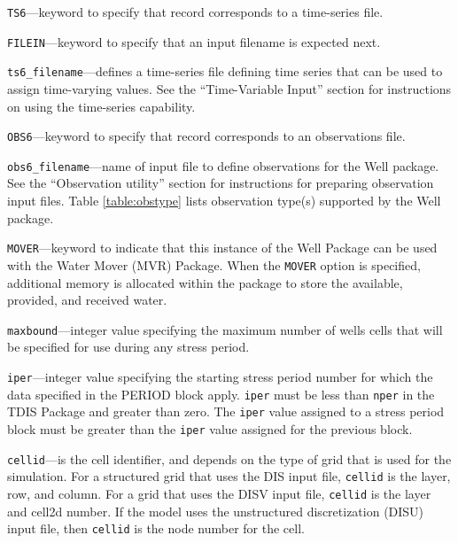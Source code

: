 \item \texttt{TS6}---keyword to specify that record corresponds to a time-series file.

\item \texttt{FILEIN}---keyword to specify that an input filename is expected next.

\item \texttt{ts6\_filename}---defines a time-series file defining time series that can be used to assign time-varying values. See the ``Time-Variable Input'' section for instructions on using the time-series capability.

\item \texttt{OBS6}---keyword to specify that record corresponds to an observations file.

\item \texttt{obs6\_filename}---name of input file to define observations for the Well package. See the ``Observation utility'' section for instructions for preparing observation input files. Table \ref{table:obstype} lists observation type(s) supported by the Well package.

\item \texttt{MOVER}---keyword to indicate that this instance of the Well Package can be used with the Water Mover (MVR) Package.  When the \texttt{MOVER} option is specified, additional memory is allocated within the package to store the available, provided, and received water.

\item \texttt{maxbound}---integer value specifying the maximum number of wells cells that will be specified for use during any stress period.

\item \texttt{iper}---integer value specifying the starting stress period number for which the data specified in the PERIOD block apply.  \texttt{iper} must be less than \texttt{nper} in the TDIS Package and greater than zero.  The \texttt{iper} value assigned to a stress period block must be greater than the \texttt{iper} value assigned for the previous block.

\item \texttt{cellid}---is the cell identifier, and depends on the type of grid that is used for the simulation.  For a structured grid that uses the DIS input file, \texttt{cellid} is the layer, row, and column.   For a grid that uses the DISV input file, \texttt{cellid} is the layer and cell2d number.  If the model uses the unstructured discretization (DISU) input file, then \texttt{cellid} is the node number for the cell.

